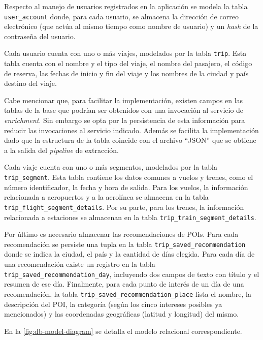 Respecto al manejo de usuarios registrados en la aplicación se modela la tabla \texttt{user\_account} donde, para cada
usuario, se almacena la dirección de correo electrónico (que actúa al mismo tiempo como nombre de usuario) y un
\textit{hash} de la contraseña del usuario.

Cada usuario cuenta con uno o más viajes, modelados por la tabla \texttt{trip}.
Esta tabla cuenta con el nombre y el tipo del viaje, el nombre del pasajero, el código de reserva, las fechas de inicio y fin
del viaje y los nombres de la ciudad y país destino del viaje.

Cabe mencionar que, para facilitar la implementación, existen campos en las tablas de la base que podrían ser obtenidos
con una invocación al servicio de \textit{enrichment}.
Sin embargo se opta por la persistencia de esta información para reducir las invocaciones al servicio indicado.
Además se facilita la implementación dado que la estructura de la tabla coincide con el archivo ``JSON'' que se obtiene
a la salida del \textit{pipeline} de extracción.

Cada viaje cuenta con uno o más segmentos, modelados por la tabla \texttt{trip\_segment}.
Esta tabla contiene los datos comunes a vuelos y trenes, como el número identificador, la fecha y hora de salida.
Para los vuelos, la información relacionada a aeropuertos y a la aerolínea se almacena en la tabla
\texttt{trip\_flight\_segment\_details}.
Por su parte, para los trenes, la información relacionada a estaciones se almacenan en la tabla
\texttt{trip\_train\_segment\_details}.

Por último es necesario almacenar las recomendaciones de POIs.
Para cada recomendación se persiste una tupla en la tabla \texttt{trip\_saved\_recommendation} donde se indica la
ciudad, el país y la cantidad de días elegida.
Para cada día de una recomendación existe un registro en la tabla \texttt{trip\_saved\_recommendation\_day}, incluyendo
dos campos de texto con título y el resumen de ese día.
Finalmente, para cada punto de interés de un día de una recomendación, la tabla
\texttt{trip\_saved\_recommendation\_place} lista el nombre, la descripción del POI, la categoría (según los cinco
intereses posibles ya mencionados) y las coordenadas geográficas (latitud y longitud) del mismo.

En la \autoref{fig:db-model-diagram} se detalla el modelo relacional correspondiente.

\begin{figure}[H]
    \centering
    \resizebox{0.96\textwidth}{!}{}
    \label{fig:db-model-diagram}
\end{figure}

